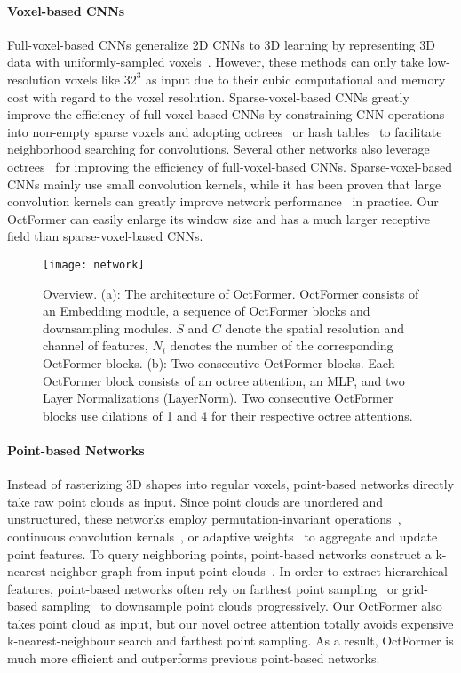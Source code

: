 \documentclass[acmtog,screen,authorversion]{acmart}
\begin{document}
\paragraph{Voxel-based CNNs}
Full-voxel-based CNNs generalize 2D CNNs to 3D learning by representing 3D data with uniformly-sampled voxels~\cite{Wu2015,Maturana2015,Qi2016}.
However, these methods can only take low-resolution voxels like $32^3$ as input due to their cubic computational and memory cost with regard to the voxel resolution.
Sparse-voxel-based CNNs greatly improve the efficiency of full-voxel-based CNNs by constraining CNN operations into non-empty sparse voxels and adopting octrees~\cite{Wang2017,Wang2018a} or hash tables~\cite{Graham2018,Shao2018,Choy2019} to facilitate neighborhood searching for convolutions.
Several other networks also leverage octrees~\cite{Riegler2017,Riegler2017a,Lei2019} for improving the efficiency of full-voxel-based CNNs.
Sparse-voxel-based CNNs mainly use small convolution kernels, while it has been proven that large convolution kernels can greatly improve network performance~\cite{Chen2022} in practice.
Our OctFormer can easily enlarge its window size and has a much larger receptive field than sparse-voxel-based CNNs.


\begin{figure*}[ht]
  \centering
  \texttt{[image: network]}
  \caption{Overview.
  (a): The architecture of OctFormer. OctFormer consists of an Embedding module, a sequence of OctFormer blocks and downsampling modules.
  $S$ and $C$ denote the spatial resolution and channel of features, $N_i$ denotes the number of the corresponding OctFormer blocks.  
  (b): Two consecutive OctFormer blocks. 
  Each OctFormer block consists of an octree attention, an MLP, and two Layer Normalizations (LayerNorm). Two consecutive OctFormer blocks use dilations of 1 and 4 for their respective octree attentions. }
  \label{fig:octformer}
\end{figure*}


\paragraph{Point-based Networks}
Instead of rasterizing 3D shapes into regular voxels, point-based networks directly take raw point clouds as input.
Since point clouds are unordered and unstructured, these networks employ permutation-invariant operations~\cite{Qi2017a,Qi2017,Li2018}, continuous convolution kernals~\cite{Atzmon2018,Thomas2019,Fey2018}, or adaptive weights~\cite{Simonovsky2017,Wu2019a} to aggregate and update point features.
To query neighboring points, point-based networks construct a k-nearest-neighbor graph from input point clouds~\cite{Qi2017,Li2018,Xu2018,Simonovsky2017,Fey2018}.
In order to extract hierarchical features, point-based networks often rely on farthest point sampling~\cite{Qi2017} or grid-based sampling~\cite{Thomas2019,Hu2019} to downsample point clouds progressively.
Our OctFormer also takes point cloud as input, but our novel octree attention totally avoids expensive k-nearest-neighbour search and farthest point sampling.
As a result, OctFormer is much more efficient and outperforms previous point-based networks.
\end{document}
